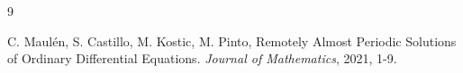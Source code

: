 \documentclass[english,reqno]{amsart}
\numberwithin{equation}{section}
\theoremstyle{plain}
\theoremstyle{definition}
\theoremstyle{remark}
\begin{document}
\begin{thebibliography}{9}








 C. Maul\'en, S. Castillo, M. Kostic, M. Pinto, Remotely Almost Periodic Solutions of Ordinary Differential Equations. \textit{Journal of Mathematics}, 2021, 1-9.




















\end{thebibliography}
\end{document}
